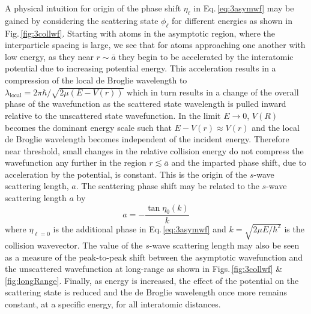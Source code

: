A physical intuition for origin of the phase shift $\eta_{\ell}$ in Eq.\,\ref{eq:3asymwf} may be gained by considering the scattering state $\phi_{\ell}$ for different energies as shown in Fig.\,\ref{fig:3collwf}.
Starting with atoms in the asymptotic region, where the interparticle spacing is large, we see that for atoms approaching one another with low energy, as they near $r\sim\bar{a}$ they begin to be accelerated by the interatomic potential due to increasing potential energy.
This acceleration results in a compression of the local de Broglie wavelength to $\lambda_{\text{local}} = 2\pi\hbar/\sqrt{2\mu(E-V(r))}$ which in turn results in a change of the overall phase of the wavefunction as the scattered state wavelength is pulled inward relative to the unscattered state wavefunction.
In the limit $E\rightarrow0$, $V(R)$ becomes the dominant energy scale such that $E - V(r) \approx V(r)$ and the local de Broglie wavelength becomes independent of the incident energy.
Therefore near threshold, small changes in the relative collision energy do not compress the wavefunction any further in the region $r\lesssim\bar{a}$ and the imparted phase shift, due to acceleration by the potential, is constant.
This is the origin of the $s$-wave scattering length, $a$.
The scattering phase shift may be related to the $s$-wave scattering length $a$ by
\begin{equation}
	a = -\frac{\tan \eta_0(k)}{k}
\end{equation}
where $\eta_{\ell=0}$ is the additional phase in Eq.\,\ref{eq:3asymwf} and $k=\sqrt{2 \mu E/\hbar^2}$ is the collision wavevector.
The value of the $s$-wave scattering length may also be seen as a measure of the peak-to-peak shift between the asymptotic wavefunction and the unscattered wavefunction at long-range as shown in Figs.\,\ref{fig:3collwf} \& \ref{fig:longRange}.
Finally, as energy is increased, the effect of the potential on the scattering state is reduced and the de Broglie wavelength once more remains constant, at a specific energy, for all interatomic distances.

